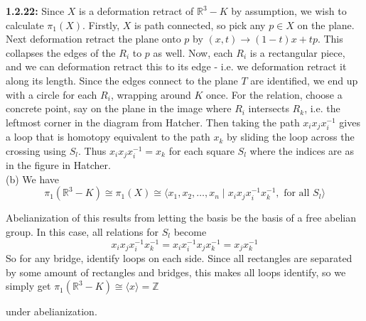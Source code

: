 \documentclass[a4paper]{article}
\begin{document}
 \textbf{1.2.22:} Since $X$ is a deformation retract
 of $\mathbb{R}^3 - K$ by assumption, we wish to calculate
 $\pi_1 (X)$. Firstly, $X$ is path connected, so pick any
  $p \in X$ on the plane. Next deformation retract
  the plane onto $p$ by
  $(x,t) \to (1-t)x + tp$. This collapses the edges of
  the $R_i$ to $p$ as well. Now, each
  $R_i$ is a rectangular piece, and we can deformation retract
  this to its edge - i.e. we deformation retract it along its length.
  Since the edges connect to the plane $T$ are identified, we end up with
  a circle for each $R_i$, wrapping around $K$ once. For the relation,
  choose a concrete point, say on the plane in the image where
  $R_i$ intersects $R_k$, i.e. the leftmost corner in the diagram from
  Hatcher. Then taking the path $x_i x_j x_i^{-1}$ gives a loop
  that is homotopy equivalent to the path $x_k$ by sliding the loop
  across the crossing using $S_l$.
  Thus $x_i x_j x_i^{-1} = x_k$ for each square $S_l$ where
  the indices are as in the figure in Hatcher.\\
  \linebreak
  (b) We have
  \[
  \pi_1 \left( \mathbb{R}^3 - K \right) 
  \cong \pi_1 (X) \cong
  \langle x_1, x_2, \ldots, x_n  \mid x_i x_j x_i^{-1} x_k^{-1}
  , \text{ for all } S_{l} \rangle
  \] 
  
  Abelianization of this results from letting the basis be the basis of a free
  abelian group. In this case, all relations
  for $S_l$ become
  \[
  x_i x_j x_i^{-1} x_k^{-1} = x_i x_i^{-1} x_j x_k^{-1}
  = x_j x_k^{-1}
  \] 
  So for any bridge, identify loops on each side.
  Since all rectangles are separated by some amount of rectangles and bridges,
this makes all loops identify, so we simply get
  $\pi_1 \left( \mathbb{R}^3 - K \right) \cong
  \langle x \rangle = \mathbb{Z}$
  
  under abelianization.

  
\end{document}
